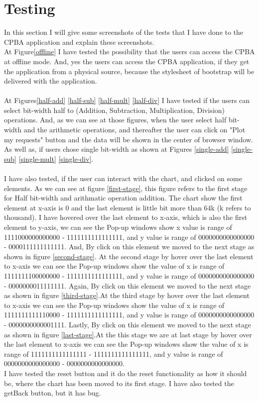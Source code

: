 \documentclass[11pt]{article}
\begin{document}
\section{Testing}
In this section I will give some screenshots of the tests that I have done to the CPBA application and explain these screenshots.\\
At Figure\ref{offline} I have tested the possibility that the users can access the CPBA at offline mode. And, yes the users can access the CPBA application, if they get the application from a physical source, because the stylesheet of bootstrap will be delivered with the application.\\\\
At Figures\ref{half-add} \ref{half-sub} \ref{half-mult} \ref{half-div} I have tested if the users can select bit-width half to (Addition, Subtraction, Multiplication, Division) operations. And, as we can see at those figures, when the user select half bit-width and the arithmetic operations, and thereafter the user can click on "Plot my requests" button and the data will be shown in the center of browser window. As well as, if users chose single bit-width as shown at Figures \ref{single-add} \ref{single-sub} \ref{single-mult} \ref{single-div}.\\\\
I have also tested, if the user can interact with the chart, and clicked on some elements. As we can see at figure \ref{first-stage}, this figure refers to the first stage for Half bit-width and arithmatic operation addition. The chart show the first element at x-axis is 0 and the last element is little bit more than 64k (k refers to  thousand). I have hovered over the last element to x-axis, which is also the first element to y-axis, we can see the Pop-up windows show x value is range of 1111000000000000 - 1111111111111111, and y value is range of 0000000000000000 - 0000111111111111. And, By click on this element we moved to the next stage as shown in figure \ref{second-stage}. At the second stage by hover over the last element to x-axis we can see the Pop-up windows show the value of x is range of 1111111100000000 - 1111111111111111, and y value is range of 0000000000000000 - 0000000011111111. Again, By click on this element we moved to the next stage as shown in figure \ref{third-stage}.At the third stage by hover over the last element to x-axis we can see the Pop-up windows show the value of x is range of 1111111111110000 - 1111111111111111, and y value is range of 0000000000000000 - 0000000000001111. Lastly, By click on this element we moved to the next stage as shown in figure \ref{last-stage}.At the this stage we are at last stage by hover over the last element to x-axis we can see the Pop-up windows show the value of x is range of 1111111111111111 - 1111111111111111, and y value is range of 0000000000000000 - 0000000000000000.\\
I have tested the reset button and it do the reset functionality as how it should be, where the chart has been moved to its first stage. I have also tested the getBack button, but it has bug.\\
\end{document}
